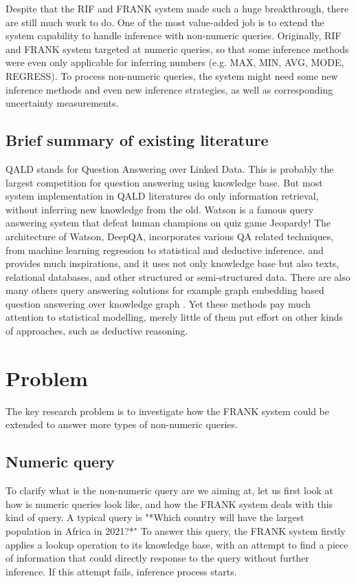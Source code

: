 \documentclass[12pt]{extarticle}
\begin{document}
Despite that the RIF and FRANK system made such a huge breakthrough, there are still much work to do. One of the most value-added job is to extend the system capability to handle inference with non-numeric queries. Originally, RIF and FRANK system targeted at numeric queries, so that some inference methods were even only applicable for inferring numbers (e.g. MAX,  MIN, AVG, MODE, REGRESS). To process non-numeric queries, the system might need some new inference methods and even new inference strategies, as well as corresponding uncertainty measurements.

\subsection{Brief summary of existing literature}
QALD \cite{unger2014question} stands for Question Answering over Linked Data. This is probably the largest competition for question answering using knowledge base. But most system implementation in QALD literatures do only information retrieval, without inferring new knowledge from the old.  Watson \cite{ferrucci2010building} is a famous query answering system that defeat human champions on quiz game  Jeopardy! The architecture of Watson, DeepQA, incorporates various QA related techniques, from machine learning regression to statistical and deductive inference. and provides much inspirations, and it uses not only knowledge base but also texts, relational databases, and other structured or semi-structured data. There are also many others query answering solutions for example graph embedding based question answering over knowledge graph \cite{huang2019knowledge}. Yet these methods pay much attention to statistical modelling, merely little of them put effort on other kinds of  approaches, such as deductive reasoning.


\section{Problem}
The key research problem is to investigate how the FRANK system could be extended to answer more types of non-numeric queries.

\subsection{Numeric query}
To clarify what is the non-numeric query are we aiming at, let us first look at how is numeric queries look like, and how the FRANK system deals with this kind of query. A typical query is "*Which country will have the largest population in Africa in 2021?*" To answer this query, the FRANK system firstly applies a lookup operation to its knowledge base, with an attempt to find a piece of information that could directly response to the query without further inference. If this attempt fails, inference process starts. 
\end{document}

